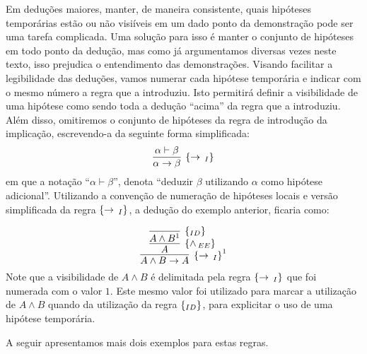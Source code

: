 Em dedu\c{c}\~oes maiores, manter, de maneira consistente, quais
hip\'oteses tempor\'arias est\~ao ou n\~ao visi\'iveis em um dado
ponto da demonstra\c{c}\~ao pode ser uma tarefa complicada. Uma
solu\c{c}\~ao para isso \'e manter o conjunto de hip\'oteses em todo
ponto da dedu\c{c}\~ao, mas como j\'a argumentamos diversas vezes
neste texto, isso prejudica o entendimento das demonstra\c{c}\~oes.
Visando
facilitar a legibilidade das dedu\c{c}\~oes, vamos numerar cada
hip\'otese tempor\'aria e indicar com o mesmo n\'umero a regra que a
introduziu. Isto permitir\'a definir a visibilidade de uma
hip\'otese como sendo toda a dedu\c{c}\~ao ``acima'' da regra que a
introduziu. Al\'em disso, omitiremos o conjunto de hip\'oteses da
regra de introdu\c{c}\~ao da implica\c{c}\~ao, escrevendo-a da
seguinte forma simplificada:
\[
     \infer[\impI]{\alpha\to \beta}
                        {\alpha \vdash \beta}
\]
em que a nota\c{c}\~ao ``$\alpha \vdash \beta$'', denota ``deduzir
$\beta$ utilizando $\alpha$ como hip\'otese adicional''.
Utilizando a conven\c{c}\~ao de numera\c{c}\~ao de hip\'oteses locais
e vers\~ao simplificada da regra $\scriptsize{\{\to\,_I\}}$, a dedu\c{c}\~ao do
exemplo anterior, ficaria como:

   \[
       \infer[\impI^1]{A \land B \to A}
                          {
                            \infer[\andEE]{A}
                                                 {
                                                   \infer[\Id]{A
                                                     \land B^1}
                                                     {}
                                                 }
                          }
   \]
Note que a visibilidade de $A\land B$ \'e delimitada pela regra
$\scriptsize{\{\to\,_I\}}$ que foi numerada com o valor $1$. Este mesmo valor foi
utilizado para marcar a utiliza\c{c}\~ao de $A\land B$ quando da
utiliza\c{c}\~ao da regra $\scriptsize{\{_{ID}\}}$, para explicitar o uso de uma
hip\'otese tempor\'aria.

A seguir apresentamos mais dois exemplos para estas regras.

